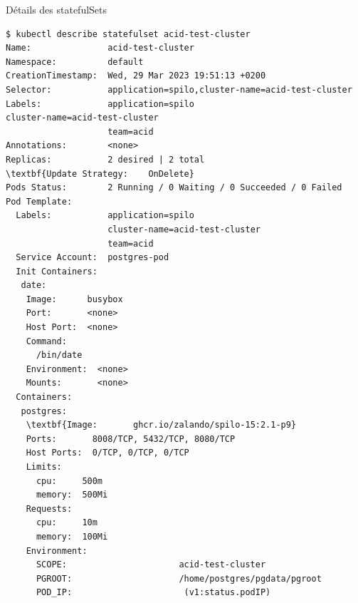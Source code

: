 
\begin{frame}[fragile,shrink=8]{Détails des statefulSets}

\begin{tiny}
\begin{Verbatim}[commandchars=\\\{\}]
$ kubectl describe statefulset acid-test-cluster
Name:               acid-test-cluster 
Namespace:          default         
CreationTimestamp:  Wed, 29 Mar 2023 19:51:13 +0200      
Selector:           application=spilo,cluster-name=acid-test-cluster                                                                                                                          Labels:             application=spilo                                                                                                                                                                             cluster-name=acid-test-cluster                                                                                                                                            
                    team=acid         
Annotations:        <none>
Replicas:           2 desired | 2 total
\textbf{Update Strategy:    OnDelete}
Pods Status:        2 Running / 0 Waiting / 0 Succeeded / 0 Failed
Pod Template:
  Labels:           application=spilo
                    cluster-name=acid-test-cluster                           
                    team=acid
  Service Account:  postgres-pod
  Init Containers:
   date:                                                                                       
    Image:      busybox
    Port:       <none> 
    Host Port:  <none>
    Command:           
      /bin/date                 
    Environment:  <none>          
    Mounts:       <none>                                                                       
  Containers:             
   postgres:           
    \textbf{Image:       ghcr.io/zalando/spilo-15:2.1-p9}
    Ports:       8008/TCP, 5432/TCP, 8080/TCP
    Host Ports:  0/TCP, 0/TCP, 0/TCP
    Limits:                                                                                                                                                                                   
      cpu:     500m
      memory:  500Mi
    Requests:
      cpu:     10m
      memory:  100Mi
    Environment:
      SCOPE:                      acid-test-cluster
      PGROOT:                     /home/postgres/pgdata/pgroot
      POD_IP:                      (v1:status.podIP)

\end{Verbatim}
\end{tiny}
\end{frame}
